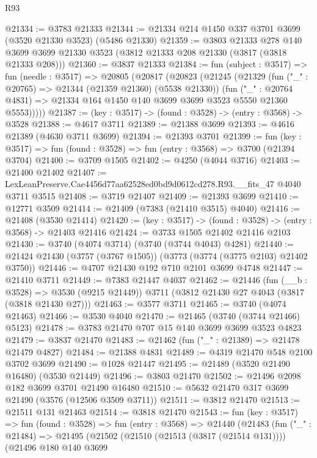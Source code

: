 \begin{lexlean}{R93}
\begin{coremodule}
@21334 := @3783 @21333
@21344 := @21334 @214 @1450 @337 @3701 @3699 (@3520 @21330 @3523) (@5486 @21330)
@21359 := @3803
    @21333
    @278
    @140
    @3699
    @3699
    @21330
    @3523
    (@3812 @21333 @208 @21330 (@3817 (@3818 @21333 @208)))
@21360 := @3837 @21333
@21384 := fun (subject : @3517) =>
  fun (needle : @3517) =>
  @20805
    (@20817
      (@20823
        (@21245
          (@21329
            (fun ("_" : @20765) => @21344 (@21359 @21360) (@5538 @21330))
            (fun ("_" : @20764 @4831) =>
            @21334 @164 @1450 @140 @3699 @3699 @3523 @5550 @21360 @5553)))))
@21387 := (key : @3517) -> (found : @3528) -> (entry : @3568) -> @3528
@21388 := @4617 @3711
@21389 := @21388 @3699
@21393 := @4616 @21389 (@4630 @3711 @3699)
@21394 := @21393 @3701
@21399 := fun (key : @3517) => fun (found : @3528) => fun (entry : @3568) => @3700 (@21394 @3704)
@21400 := @3709 @1505
@21402 := @4250 (@4044 @3716)
@21403 := @21400 @21402
@21407 := LexLeanPreserve.Cae4456d77aa62528ed0bd9d0612cd278.R93.__fits_47 @4040 @3711 @3515
@21408 := @3719 @21407
@21409 := @21393 @3699
@21410 := @12771 @3509
@21414 := @21409 (@7383 (@21410 @3515) @4040)
@21416 := @21408 (@3530 @21414)
@21420 := (key : @3517) -> (found : @3528) -> (entry : @3568) -> @21403 @21416
@21424 := @3733 @1505 @21402 @21416 @2103
@21430 := @3740 (@4074 @3714) (@3740 (@3744 @4043) @4281)
@21440 := @21424 @21430 (@3757 (@3767 @1505)) (@3773 (@3774 (@3775 @2103) @21402 @3750))
@21446 := @4707 @21430 @192 @710 @2101 @3699 @4748
@21447 := @21410 @3711
@21449 := @7383 @21447 @4037
@21462 := @21446
    (fun (__b : @3528) => @3530 (@9215 @21449))
    @3711
    (@3812 @21430 @27 @4043 (@3817 (@3818 @21430 @27)))
@21463 := @3577 @3711
@21465 := @3740 (@4074 @21463)
@21466 := @3530 @4040
@21470 := @21465 (@3740 (@3744 @21466) @5123)
@21478 := @3783 @21470 @707 @15 @140 @3699 @3699 @3523 @4823
@21479 := @3837 @21470
@21483 := @21462 (fun ("_" : @21389) => @21478 @21479 @4827)
@21484 := @21388 @4831
@21489 := @4319 @21470 @548 @2100 @3702 @3699
@21490 := @1028 @21447
@21495 := @21489 (@3520 @21490 @16480) (@3530 @21449)
@21496 := @3803 @21470
@21502 := @21496 @2098 @182 @3699 @3701 @21490 @16480
@21510 := @5632 @21470 @317 @3699 @21490 (@3576 (@12506 @3509 @3711))
@21511 := @3812 @21470
@21513 := @21511 @131 @21463
@21514 := @3818 @21470
@21543 := fun (key : @3517) =>
  fun (found : @3528) =>
  fun (entry : @3568) =>
  @21440
    (@21483
      (fun ("_" : @21484) =>
      @21495
        (@21502
          (@21510 (@21513 (@3817 (@21514 @131))))
          (@21496
            @180
            @140
            @3699

\end{coremodule}
\end{lexlean}
